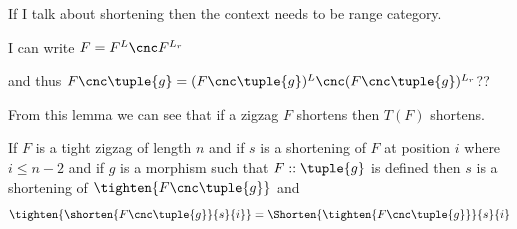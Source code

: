 \begin{aside}
If I talk about shortening then the context
needs to be  range category.
\end{aside}

\begin{aside}
I can write  $F= F^{L} \cnc F^{L_r}$

and thus $F\cnc\tuple{g} = (F\cnc\tuple{g})^{L} \cnc (F\cnc\tuple{g})^{L_r}$??

\end{aside}

From this lemma we can see that if a zigzag $F$ shortens then $T(F)$ shortens.
\newpage
\begin{lemma}

If $F$ is a tight zigzag of length $n$ and if $s$ is a shortening of $F$ at 
position $i$ where
$i \leq  n-2$ and if $g$ is a morphism such that $F :: \tuple{g}$ is
defined then $s$ is a shortening of $\tighten{F\cnc\tuple{g}}$
and 
\[
\tighten{
  \shorten{F\cnc\tuple{g}}
          {s}{i}
        }
=\Shorten{\tighten{F\cnc\tuple{g}}}
         {s}{i}
\]
\end{lemma}
